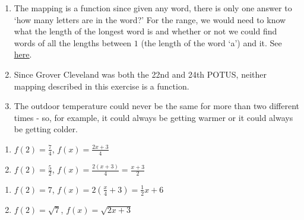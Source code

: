 \documentclass{ximera}
\begin{document}
\begin{enumerate}

\setcounter{enumi}{\value{HW}}

\item    The mapping is a function since given any word, there is only one answer to `how many letters are in the word?'  For the range, we would need to know what the length of the longest word is and whether or not we could find words of all the lengths between $1$ (the length of the word `a') and it.  See \href{https://en.wikipedia.org/wiki/Longest_word_in_English}{\underline{here}}.

\item  Since Grover Cleveland was both the 22nd and 24th POTUS, neither mapping described in this exercise is a function.

\item  The outdoor temperature could never be the same for more than two different times - so, for example, it could always be getting warmer or it could always be getting colder.

\setcounter{HW}{\value{enumi}}

\end{enumerate}

\begin{multicols}{2}
\begin{enumerate}
\setcounter{enumi}{\value{HW}}

\item $f(2) = \frac{7}{4}$, $f(x) = \frac{2x+3}{4}$

\item $f(2) = \frac{5}{2}$, $f(x) = \frac{2(x+3)}{4} = \frac{x+3}{2}$  

\setcounter{HW}{\value{enumi}}
\end{enumerate}
\end{multicols}

\begin{multicols}{2}
\begin{enumerate}
\setcounter{enumi}{\value{HW}}

\item $f(2) = 7$, $f(x) = 2\left(\frac{x}{4} + 3\right) = \frac{1}{2} x + 6$   

\item $f(2) = \sqrt{7}$, $f(x) = \sqrt{2x+3}$ 

\setcounter{HW}{\value{enumi}}
\end{enumerate}
\end{multicols}
\end{document}
